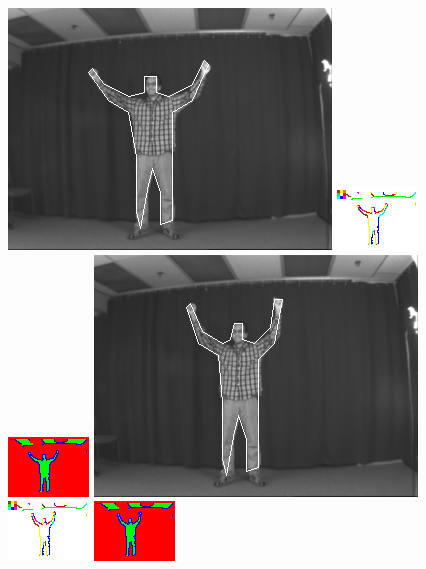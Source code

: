 \documentclass{tufte-book}
\begin{document}
\begin{figure}
\includegraphics[width=0.3 \linewidth]{output/2.detection/image_parsing/out.6.d/thefinalparse.png}
\includegraphics[width=0.3 \linewidth]{output/2.detection/image_parsing/out.6.d/local.x5.orientations.png}
\includegraphics[width=0.3 \linewidth]{output/2.detection/image_parsing/out.6.d/local.x5.interior.png}
\includegraphics[width=0.3 \linewidth]{output/2.detection/image_parsing/out.7.d/thefinalparse.png}
\includegraphics[width=0.3 \linewidth]{output/2.detection/image_parsing/out.7.d/local.x5.orientations.png}
\includegraphics[width=0.3 \linewidth]{output/2.detection/image_parsing/out.7.d/local.x5.interior.png}
\end{figure}
\end{document}
